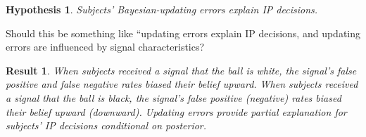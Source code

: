 \documentclass[12pt,a4paper]{article}
\newcommand{\pmt}[1]{{\color{Blue}#1}}
\newtheorem{hypothesis}{Hypothesis}
\newtheorem{result}{Result}
\begin{document}

\begin{table}[H]\centering 
\caption{Average Protection by Signal Type} 
\label{tab:nonparIP}
\end{table}





\begin{hypothesis} Subjects' Bayesian-updating errors explain IP decisions. \end{hypothesis}
\pmt{Should this be something like ``updating errors explain IP decisions, and updating errors are influenced by signal characteristics?}
\begin{result} When subjects received a signal that the ball is white, the signal's false positive and false negative rates biased their belief upward. When subjects received a signal that the ball is black, the signal's false positive (negative) rates biased their belief upward (downward). Updating errors provide partial explanation for subjects' IP decisions conditional on posterior.\end{result}
\end{document}
